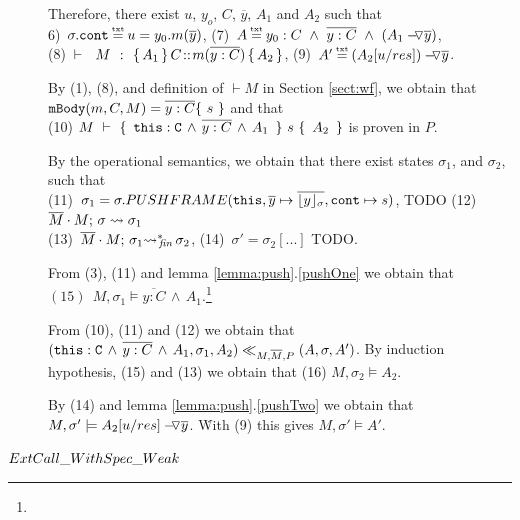 \begin{description}
\item[ {}]

Therefore, there exist $u$, $y_o$, $C$, $\overline y$,  $A_1$ and $A_2$ such that \\
6)\ $\sigma.\prg{cont}\txteq u=y_0.m(\overline y)$,   \hspace{2cm}
 (7)\ $A \txteq y_0:C  \ \wedge\ \overline {y:C}\ \wedge \  (\PushAS  {y} {A_1})$, 
\\
 (8)\ $\promises M {\mprepost{A_1}{C}{m}{y}{C}{  {A_2}} }$,    \hspace{1cm}
 (9)\ $A' \txteq  {\PushAS  {y} {(A_2[ u/res])}}$. 

By (1), (8), and definition of $\vdash M$ in Section \ref{sect:wf}, we obtain that   $\prg{mBody}(m,C,M)=\overline{y:C}\{\  s \ \}$ and that\\
(10)   ${\hproves{M} { \ \prg{this}:\prg{C}\, \wedge\, \overline{y:C}\, \wedge\, A_1\  } {\ s\ } {\ A_2\ } }$ is proven in $P$.
 
 By the operational semantics, we obtain that there exist states $\sigma_1$, and $\sigma_2$, such that \\
 (11)\ $\sigma_1=\sigma.PUSHFRAME(\prg{this}, {\overline y} \mapsto \overline{\interpret {\sigma} y},\prg{cont} \mapsto s) $, TODO   \hspace{1cm}
   (12)\ $\leadstoBounded  {\Mtwo\cdot M}  {\sigma}  {\sigma_1}$ \\
 (13)\ $\leadstoBoundedStarFin {\Mtwo\cdot M}  {\sigma_1}  {\sigma_2}$,   \hspace{3cm}
 (14)\ $\sigma'=\sigma_2[...]$ TODO.
 
 From (3), (11) and lemma \ref{lemma:push}.\ref{pushOne}  we obtain that \ \ \  $ (15) \ \ M, \sigma_1 \models \overline{y:C}\, \wedge\, A_1$.\footnote{}
 
 From (10), (11) and (12) we obtain that $( \prg{this}:\prg{C}\, \wedge\, \overline{y:C}\, \wedge\, A_1,\sigma_1,A_2) \ll_{M,\Mtwo,P} (A,\sigma,A')$. By induction hypothesis, (15) and (13) we obtain that (16) $M,\sigma_2 \models A_2$.
 
 By (14) and lemma  \ref{lemma:push}.\ref{pushTwo}  we obtain that 
\ \ $M,\sigma' \models \PushAS  {y} {A_2[ u/res]}$. \. With (9) this gives $M,\sigma' \models A'$.

\item[${\sc{ExtCall\_WithSpec\_Weak}}$]


\end{description}
